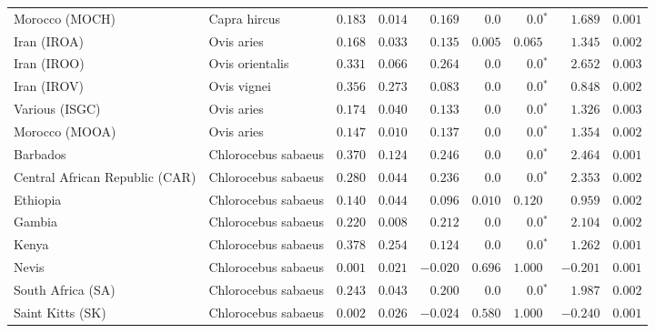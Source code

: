 \begin{center}
\begin{adjustbox}{width = 1\textwidth}
\begin{tabular}{|l|l|r|r|r|r|r|r|r|}
            Morocco (MOCH)                    & Capra hircus     & $ 0.183$ & $ 0.014$  & $ 0.169$ & $0.0$    & $\bm{0.0{^*}}$ & $ 1.689$ & $ 0.001$ \\
            Iran (IROA)                    & Ovis aries         & $ 0.168$ & $ 0.033$  & $ 0.135$ & $ 0.005$    & $ 0.065~~$ & $ 1.345$ & $ 0.002$ \\
            Iran (IROO)                 & Ovis orientalis          & $ 0.331$ & $ 0.066$  & $ 0.264$ & $0.0$    & $\bm{0.0{^*}}$ & $ 2.652$ & $ 0.003$ \\
            Iran (IROV)                 & Ovis vignei          & $ 0.356$ & $ 0.273$  & $ 0.083$ & $0.0$    & $\bm{0.0{^*}}$ & $ 0.848$ & $ 0.002$ \\
            Various (ISGC)                       & Ovis aries & $ 0.174$ & $ 0.040$  & $ 0.133$ & $0.0$    & $\bm{0.0{^*}}$ & $ 1.326$ & $ 0.003$ \\
            Morocco (MOOA) & Ovis aries & $ 0.147$ & $ 0.010$  & $ 0.137$ & $0.0$ & $\bm{0.0{^*}}$ & $ 1.354$ & $ 0.002$ \\
            Barbados                       & Chlorocebus sabaeus & $ 0.370$ & $ 0.124$  & $ 0.246$ & $0.0$ & $\bm{0.0{^*}}$     & $ 2.464$ & $ 0.001$ \\
            Central African Republic (CAR)                         & Chlorocebus sabaeus & $ 0.280$ & $ 0.044$  & $ 0.236$ & $0.0$    & $\bm{0.0{^*}}$ & $ 2.353$ & $ 0.002$ \\
            Ethiopia                          & Chlorocebus sabaeus & $ 0.140$ & $ 0.044$  & $ 0.096$ & $ 0.010$    & $ 0.120~~$ & $ 0.959$ & $ 0.002$ \\
            Gambia                          & Chlorocebus sabaeus & $ 0.220$ & $ 0.008$  & $ 0.212$ & $0.0$ & $\bm{0.0{^*}}$     & $ 2.104$ & $ 0.002$ \\
            Kenya              & Chlorocebus sabaeus & $ 0.378$ & $ 0.254$  & $ 0.124$ & $0.0$    & $\bm{0.0{^*}}$ & $ 1.262$ & $ 0.001$ \\
            Nevis               & Chlorocebus sabaeus & $ 0.001$ & $ 0.021$  & $-0.020$ & $ 0.696$ & $ 1.000~~$ & $-0.201$ & $ 0.001$ \\
            South Africa (SA)                         & Chlorocebus sabaeus & $ 0.243$ & $ 0.043$  & $ 0.200$ & $0.0$ & $\bm{0.0{^*}}$     & $ 1.987$ & $ 0.002$ \\
            Saint Kitts (SK)                  & Chlorocebus sabaeus        & $ 0.002$ & $ 0.026$  & $-0.024$ & $ 0.580$ & $ 1.000~~$     & $-0.240$ & $ 0.001$ \\

\end{tabular}
\end{adjustbox}
\end{center}
